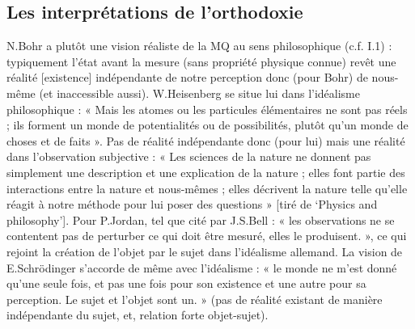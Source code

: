 \subsection{Les interprétations de l’orthodoxie}
N.Bohr a plutôt une vision réaliste de la MQ au sens philosophique (c.f. I.1) : typiquement
l’état avant la mesure (sans propriété physique connue) revêt une réalité [existence]
indépendante de notre perception donc (pour Bohr) de nous-même (et inaccessible aussi).
W.Heisenberg se situe lui dans l’idéalisme philosophique : « Mais les atomes ou les
particules élémentaires ne sont pas réels ; ils forment un monde de potentialités ou de
possibilités, plutôt qu’un monde de choses et de faits ». Pas de réalité indépendante donc
(pour lui) mais une réalité dans l’observation subjective : « Les sciences de la nature ne
donnent pas simplement une description et une explication de la nature ; elles font partie des
interactions entre la nature et nous-mêmes ; elles décrivent la nature telle qu’elle réagit à
notre méthode pour lui poser des questions » [tiré de ‘Physics and philosophy’].
Pour P.Jordan, tel que cité par J.S.Bell : « les observations ne se contentent pas de perturber
ce qui doit être mesuré, elles le produisent. », ce qui rejoint la création de l’objet par le sujet
dans l’idéalisme allemand.
La vision de E.Schrödinger s’accorde de même avec l’idéalisme : « le monde ne m’est
donné qu’une seule fois, et pas une fois pour son existence et une autre pour sa perception.
Le sujet et l’objet sont un. » (pas de réalité existant de manière indépendante du sujet, et,
relation forte objet-sujet).
